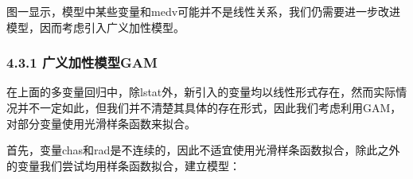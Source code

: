 \documentclass[UTF-8]{ctexart}
\begin{document}
\begin{figure}[H]
	\centering
\end{figure}
图一显示，模型中某些变量和medv可能并不是线性关系，我们仍需要进一步改进模型，因而考虑引入广义加性模型。

\subsubsection{4.3.1 广义加性模型GAM}

在上面的多变量回归中，除lstat外，新引入的变量均以线性形式存在，然而实际情况并不一定如此，但我们并不清楚其具体的存在形式，因此我们考虑利用GAM，对部分变量使用光滑样条函数来拟合。

首先，变量chas和rad是不连续的，因此不适宜使用光滑样条函数拟合，除此之外的变量我们尝试均用样条函数拟合，建立模型：
\end{document}
